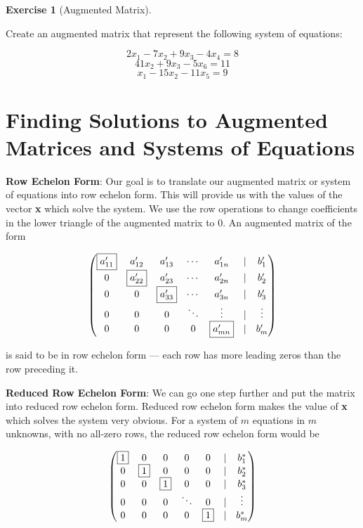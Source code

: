\documentclass[
]{book}
\theoremstyle{definition}
\theoremstyle{definition}
\theoremstyle{definition}
\newtheorem{exercise}{Exercise}[chapter]
\theoremstyle{remark}
\begin{document}
\begin{exercise}[Augmented Matrix]
\protect\hypertarget{exr:augmatrix}{}{\label{exr:augmatrix} {} }

Create an augmented matrix that represent the following system of equations:

\[2x_1 -7x_2 + 9x_3 -4x_4 = 8\]
\[41x_2 + 9x_3 -5x_6 = 11\]
\[x_1 -15x_2 -11x_5 = 9\]
\end{exercise}

\hypertarget{finding-solutions-to-augmented-matrices-and-systems-of-equations}{%
\section{Finding Solutions to Augmented Matrices and Systems of Equations}\label{finding-solutions-to-augmented-matrices-and-systems-of-equations}}

\textbf{Row Echelon Form}: Our goal is to translate our augmented matrix or system of equations into row echelon form. This will provide us with the values of the vector \textbf{x} which solve the system. We use the row operations to change coefficients in the lower triangle of the augmented matrix to 0. An augmented matrix of the form

\[\begin{pmatrix}
            \fbox{$a'_{11}$}& a'_{12} & a'_{13}& \cdots & a'_{1n} & | & b'_1\\
            0 & \fbox{$a'_{22}$} & a'_{23}& \cdots & a'_{2n} & | & b'_2\\
            0 & 0 & \fbox{$a'_{33}$}& \cdots & a'_{3n} & | & b'_3\\
            0 & 0 &0 & \ddots & \vdots  & | & \vdots \\
            0 & 0 &0 &0 & \fbox{$a'_{mn}$} & | & b'_m
            \end{pmatrix}\]

is said to be in row echelon form --- each row has more leading zeros than the row preceding it.

\textbf{Reduced Row Echelon Form}: We can go one step further and put the matrix into reduced row echelon form. Reduced row echelon form makes the value of \textbf{x} which solves the system very obvious. For a system of \(m\) equations in \(m\) unknowns, with no all-zero rows, the reduced row echelon form would be

\[\begin{pmatrix}
            \fbox{$1$}  &  0 &   0 &    0  &   0 & | & b^*_1\\
            0  &  \fbox{$1$} &   0 &    0  &   0 & | & b^*_2\\
            0  &  0 &   \fbox{$1$} &    0  &   0 & | & b^*_3\\
            0  &  0 &   0 &\ddots &   0 & | &\vdots\\
            0  &  0 &   0 &    0  &   \fbox{$1$} & | & b^*_m
            \end{pmatrix}\]
\end{document}

